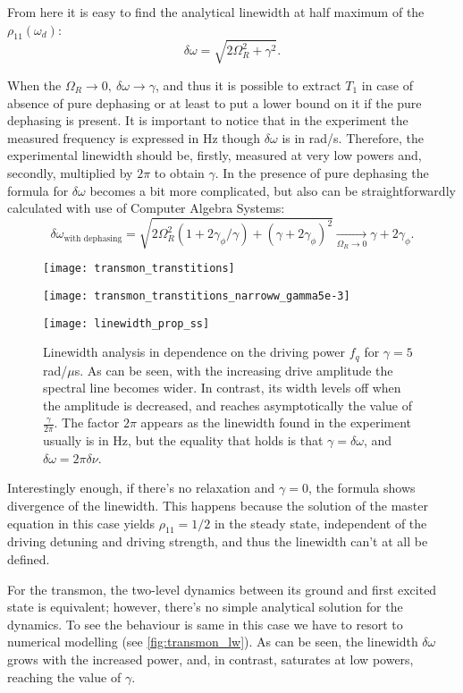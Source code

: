\documentclass[12pt, twoside]{report}
\numberwithin{equation}{section}
\begin{document}
From here it is easy to find the analytical linewidth at half maximum of the $\rho_{11}(\omega_d)$:
\[
\delta\omega = \sqrt{2\Omega_R^2+\gamma^2}.
\]

When the $\Omega_R \rightarrow 0,\ \delta\omega\rightarrow\gamma$, and thus it is possible to extract $T_1$ in case of absence of pure dephasing or at least to put a lower bound on it if the pure dephasing is present. It is important to notice that in the experiment the measured frequency is expressed in Hz though $\delta\omega$ is in rad/s. Therefore, the experimental linewidth should be, firstly, measured at very low powers and, secondly, multiplied by $2\pi$ to obtain $\gamma$. In the presence of pure dephasing the formula for $\delta\omega$ becomes a bit more complicated, but also can be straightforwardly calculated with use of Computer Algebra Systems:
\[
\delta\omega_{\text{with dephasing}} = \sqrt{2Ω_{R}^{2} (1+2 γ_{ϕ}/\gamma) + (\gamma +2\gamma_\phi)^2} \xrightarrow[\Omega_R\rightarrow 0]{} γ + 2γ_{ϕ}.
\]


\begin{figure}[h!]
\centering
\texttt{[image: transmon\_transtitions]}

\texttt{[image: transmon\_transtitions\_narroww\_gamma5e-3]}

\texttt{[image: linewidth\_prop\_ss]}

\caption{Linewidth analysis in dependence on the driving power $f_q$ for $\gamma = 5$ rad/$\mu$s. As can be seen, with the increasing drive amplitude the spectral line becomes wider. In contrast, its width levels off when the amplitude is decreased, and reaches asymptotically the value of $\frac{\gamma}{2\pi}$. The factor $2\pi$ appears as the linewidth found in the experiment usually is in Hz, but the equality that holds is that $\gamma = \delta\omega$, and $\delta\omega = 2\pi\delta\nu$.}
\label{fig:transmon_lw}
\end{figure}  

Interestingly enough, if there's no relaxation and $\gamma = 0$, the formula shows divergence of the linewidth. This happens because the solution of the master equation in this case yields $\rho_{11} = 1/2$ in the steady state, independent of the driving detuning and driving strength, and thus the linewidth can't at all be defined.

For the transmon, the two-level dynamics between its ground and first excited state is equivalent; however, there's no simple analytical solution for the dynamics. To see the behaviour is same in this case we have to resort to numerical modelling (see \autoref{fig:transmon_lw}).
As can be seen, the linewidth $\delta\omega$ grows with the increased power, and, in contrast, saturates at low powers, reaching the value of $\gamma$.

%

%

\appendix

%




\end{document}
